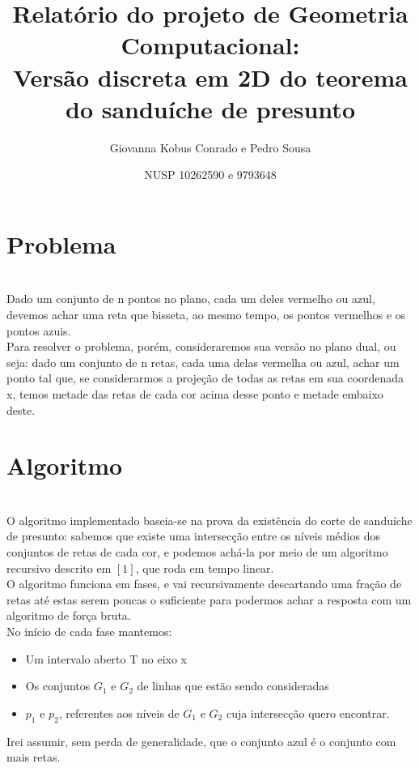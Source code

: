 \documentclass{article}
\title{Relatório do projeto de Geometria Computacional:\\
Versão discreta em 2D do teorema do sanduíche de presunto}
\author{Giovanna Kobus Conrado e Pedro Sousa}
\date{NUSP 10262590 e 9793648}
\begin{document}
\maketitle
\section{Problema}\\

Dado um conjunto de n pontos no plano, cada um deles vermelho ou azul, devemos achar uma reta que bisseta, ao mesmo tempo, os pontos vermelhos e os pontos azuis.\\

Para resolver o problema, porém, consideraremos sua versão no plano dual, ou seja: dado um conjunto de n retas, cada uma delas vermelha ou azul, achar um ponto tal que, se considerarmos a projeção de todas as retas em sua coordenada x, temos metade das retas de cada cor acima desse ponto e metade embaixo deste. 

\section{Algoritmo}\\

O algoritmo implementado baseia-se na prova da existência do corte de sanduíche de presunto: sabemos que existe uma intersecção entre os níveis médios dos conjuntos de retas de cada cor, e podemos achá-la por meio de um algoritmo recursivo descrito em  ${[1]}$, que roda em tempo linear.\\

O algoritmo funciona em fases, e vai recursivamente descartando uma fração de retas até estas serem poucas o suficiente para podermos achar a resposta com um algoritmo de força bruta.\\

No início de cada fase mantemos:

\begin{itemize}
    \item Um intervalo aberto T no eixo x
    \item Os conjuntos $G_1$ e $G_2$ de linhas que estão sendo consideradas
    \item $p_1$ e $p_2$, referentes aos níveis de $G_1$ e $G_2$ cuja intersecção quero encontrar.
\end{itemize}

Irei assumir, sem perda de generalidade, que o conjunto azul é o conjunto com mais retas.\\
\end{document}
